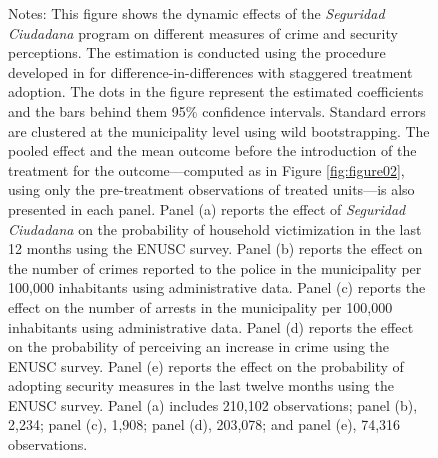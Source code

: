 \begin{figure}[h!]
    \begin{minipage}{0.99\textwidth}
        \footnotesize
        Notes: This figure shows the dynamic effects of the \textit{Seguridad Ciudadana} program on different measures of crime and security perceptions. The estimation is conducted using the procedure developed in \citet{Callaway} for difference-in-differences with staggered treatment adoption. The dots in the figure represent the estimated coefficients and the bars behind them 95\% confidence intervals. Standard errors are clustered at the municipality level using wild bootstrapping. The pooled effect and the mean outcome before the introduction of the treatment for the outcome---computed as in Figure \ref{fig:figure02}, using only the pre-treatment observations of treated units---is also presented in each panel. Panel (a) reports the effect of \textit{Seguridad Ciudadana} on the probability of household victimization in the last 12 months using the ENUSC survey. Panel (b) reports the effect on the number of crimes reported to the police in the municipality per 100,000 inhabitants using administrative data. Panel (c) reports the effect on the number of arrests in the municipality per 100,000 inhabitants using administrative data. Panel (d) reports the effect on the probability of perceiving an increase in crime using the ENUSC survey. Panel (e) reports the effect on the probability of adopting security measures in the last twelve months using the ENUSC survey. Panel (a) includes 210,102 observations; panel (b), 2,234; panel (c), 1,908; panel (d), 203,078; and panel (e), 74,316 observations.
    \end{minipage}
\end{figure}
